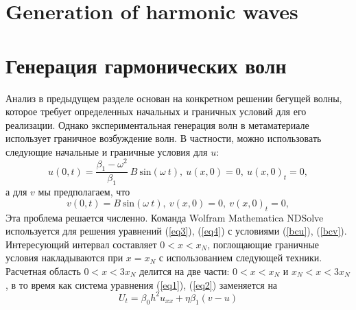 \section{Generation of harmonic waves}
\section {Генерация гармонических волн}
Анализ в предыдущем разделе основан на конкретном решении бегущей волны, которое требует определенных начальных и граничных условий для его реализации. Однако экспериментальная генерация волн в метаматериале использует граничное возбуждение волн. В частности, можно использовать следующие начальные и граничные условия для $u$:
\begin{equation}\label{bcu}
u(0,t)=\frac{\beta_1-\omega^2}{\beta_1}~B~ {\text{sin}} (\omega ~t),~u(x,0)=0, ~u(x,0)_t=0,
\end{equation}
а для $ v $ мы предполагаем, что
\begin{equation}\label{bcv}
v(0,t)=B ~{\text{sin}} (\omega ~t),~v(x,0)=0, ~v(x,0)_t=0,
\end{equation}
Эта проблема решается численно. Команда Wolfram Mathematica NDSolve используется для решения уравнений (\ref {eq3}), (\ref{eq4}) с условиями (\ref {bcu}), (\ref {bcv}).
Интересующий интервал составляет $ 0 <x < x_N $, поглощающие граничные условия накладываются при $ x = x_N $ с использованием следующей техники. Расчетная область $ 0 <x < 3 x_N $ делится на две части: $ 0 <x <x_N $ и $ x_N <x <3 x_N $, в то время как система уравнения (\ref {eq1}), (\ref {eq2}) заменяется на
$$
U_{t}=\beta_0 h^2 u_{xx}+\eta \beta_1 (v-u)
$$
